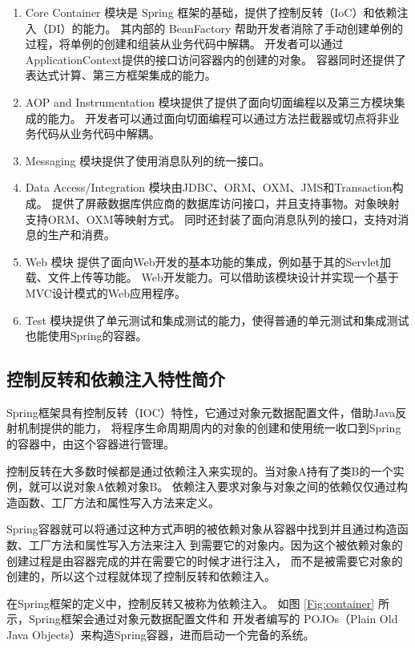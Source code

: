 \begin{enumerate}
    \item Core Container 模块是 Spring 框架的基础，提供了控制反转（IoC）和依赖注入（DI）的能力。
    其内部的 BeanFactory 帮助开发者消除了手动创建单例的过程，将单例的创建和组装从业务代码中解耦。
    开发者可以通过ApplicationContext提供的接口访问容器内的创建的对象。
    容器同时还提供了表达式计算、第三方框架集成的能力。
    \item AOP and Instrumentation 模块提供了提供了面向切面编程以及第三方模块集成的能力。
    开发者可以通过面向切面编程可以通过方法拦截器或切点将非业务代码从业务代码中解耦。
    \item Messaging 模块提供了使用消息队列的统一接口。
    \item Data Access/Integration 模块由JDBC、ORM、OXM、JMS和Transaction构成。
    提供了屏蔽数据库供应商的数据库访问接口，并且支持事物。对象映射支持ORM、OXM等映射方式。
    同时还封装了面向消息队列的接口，支持对消息的生产和消费。
    \item Web 模块 提供了面向Web开发的基本功能的集成，例如基于其的Servlet加载、文件上传等功能。
    Web开发能力。可以借助该模块设计并实现一个基于MVC设计模式的Web应用程序。
    \item Test 模块提供了单元测试和集成测试的能力，使得普通的单元测试和集成测试也能使用Spring的容器。
\end{enumerate}

\subsection{控制反转和依赖注入特性简介}
Spring框架具有控制反转（IOC）特性，它通过对象元数据配置文件，借助Java反射机制提供的能力，
将程序生命周期周内的对象的创建和使用统一收口到Spring的容器中，由这个容器进行管理。

控制反转在大多数时候都是通过依赖注入来实现的。当对象A持有了类B的一个实例，就可以说对象A依赖对象B。
依赖注入要求对象与对象之间的依赖仅仅通过构造函数、工厂方法和属性写入方法来定义。

Spring容器就可以将通过这种方式声明的被依赖对象从容器中找到并且通过构造函数、工厂方法和属性写入方法来注入
到需要它的对象内。因为这个被依赖对象的创建过程是由容器完成的并在需要它的时候才进行注入，
而不是被需要它对象的创建的，所以这个过程就体现了控制反转和依赖注入。

在Spring框架的定义中，控制反转又被称为依赖注入。
如图 \ref{Fig:container} 所示，Spring框架会通过对象元数据配置文件和
开发者编写的 POJOs（Plain Old Java Objects）来构造Spring容器，进而启动一个完备的系统。

